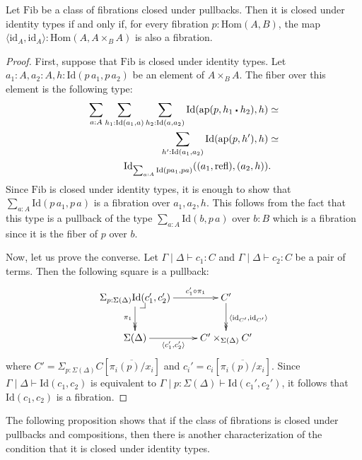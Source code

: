 \documentclass[reqno]{amsart}
\makeatletter
\theoremstyle{definition}
\theoremstyle{remark}
\newcommand{\fs}[1]{\mathrm{#1}}
\newcommand{\Hom}{\fs{Hom}}
\newcommand{\Id}{\fs{Id}}
\newcommand{\refl}{\fs{refl}}
\newcommand{\id}{\fs{id}}
\newcommand{\pmap}{\fs{ap}}
\newcommand{\Fib}{\fs{Fib}}
\numberwithin{figure}{section}
\newcommand{\ct}{%
  \mathchoice{\mathbin{\raisebox{0.25ex}{$\displaystyle\centerdot$}}}%
             {\mathbin{\raisebox{0.25ex}{$\centerdot$}}}%
             {\mathbin{\raisebox{0.25ex}{$\scriptstyle\,\centerdot\,$}}}%
             {\mathbin{\raisebox{0.25ex}{$\scriptscriptstyle\,\centerdot\,$}}}
}
\newcommand{\pb}[1][dr]{\save*!/#1-1.2pc/#1:(-1,1)@^{|-}\restore}
\makeatother
\begin{document}
\begin{prop}[fib-id]
Let $\Fib$ be a class of fibrations closed under pullbacks.
Then it is closed under identity types if and only if, for every fibration $p : \Hom(A,B)$, the map $\langle \id_A, \id_A \rangle : \Hom(A, A \times_B A)$ is also a fibration.
\end{prop}
\begin{proof}
First, suppose that $\Fib$ is closed under identity types.
Let $a_1 : A, a_2 : A, h : \Id(p\,a_1,p\,a_2)$ be an element of $A \times_B A$.
The fiber over this element is the following type:
\begin{align*}
\sum_{a : A} \sum_{h_1 : \Id(a_1,a)} \sum_{h_2 : \Id(a,a_2)} \Id(\pmap(p, h_1 \ct h_2), h) & \simeq \\
\sum_{h' : \Id(a_1,a_2)} \Id(\pmap(p,h'),h) & \simeq \\
\Id_{\sum_{a : A} \Id(p a_1, p a)}((a_1,\refl), (a_2,h)) & .
\end{align*}
Since $\Fib$ is closed under identity types, it is enough to show that $\sum_{a : A} \Id(p\,a_1,p\,a)$ is a fibration over $a_1,a_2,h$.
This follows from the fact that this type is a pullback of the type $\sum_{a : A} \Id(b,p\,a)$ over $b : B$ which is a fibration since it is the fiber of $p$ over $b$.

Now, let us prove the converse.
Let $\Gamma \mid \Delta \vdash c_1 : C$ and $\Gamma \mid \Delta \vdash c_2 : C$ be a pair of terms.
Then the following square is a pullback:
\[ \xymatrix{ \Sigma_{p : \Sigma(\Delta)} \Id(c_1',c_2') \ar[r]^-{c_1' \circ \pi_1} \ar@{->>}[d]_{\pi_1} \pb    & C' \ar@{->>}[d]^{\langle \id_{C'}, \id_{C'} \rangle} \\
              \Sigma(\Delta) \ar[r]_-{\langle c_1', c_2' \rangle}                                               & C' \times_{\Sigma(\Delta)} C'
            } \]
where $C' = \Sigma_{p : \Sigma(\Delta)} C[\overline{\pi_i(p)/x_i}]$ and $c_i' = c_i[\overline{\pi_i(p)/x_i}]$.
Since $\Gamma \mid \Delta \vdash \Id(c_1,c_2)$ is equivalent to $\Gamma \mid p : \Sigma(\Delta) \vdash \Id(c_1',c_2')$, it follows that $\Id(c_1,c_2)$ is a fibration.
\end{proof}

The following proposition shows that if the class of fibrations is closed under pullbacks and compositions, then there is another characterization of the condition that it is closed under identity types.
\end{document}
